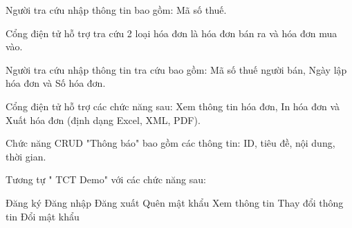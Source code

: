 
Người tra cứu nhập thông tin bao gồm: Mã số thuế.


Cổng điện tử hỗ trợ tra cứu 2 loại hóa đơn là hóa đơn bán ra và hóa đơn mua vào.

Người tra cứu nhập thông tin tra cứu bao gồm: Mã số thuế người bán, Ngày lập hóa đơn và Số hóa đơn.

Cổng điện tử hỗ trợ các chức năng sau: Xem thông tin hóa đơn, In hóa đơn và Xuất hóa đơn (định dạng Excel, XML, PDF).










Chức năng CRUD "Thông báo" bao gồm các thông tin: ID, tiêu đề, nội dung, thời gian.


Tương tự " TCT Demo" với các chức năng sau:

Đăng ký
Đăng nhập
Đăng xuất
Quên mật khẩu
Xem thông tin
Thay đổi thông tin
Đổi mật khẩu

